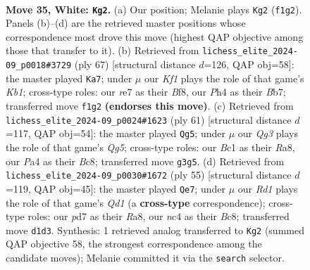 \documentclass[11pt]{article}
\begin{document}
\clearpage

\begin{figure}[p]\centering
\begin{subfigure}{0.46\textwidth}\centering
\resizebox{\linewidth}{!}{%
\newchessgame
\chessboard[
  setfen={r1b3k1/3pr1bp/1q2p3/p4p1B/P1np3P/5NQ1/1P3P2/RNBR1K2 w - - 0 35},
  showmover=false,
  pgfstyle=straightmove, color=movearrow, markmove={f1-g2}
]}
\caption{}
\end{subfigure}\hfill
\begin{subfigure}{0.46\textwidth}\centering
\resizebox{\linewidth}{!}{%
\newchessgame
\chessboard[
  setfen={1k3b2/1b6/pnr1p1Q1/qn1pP1P1/1p1P4/1P6/P1P1N2P/1KB2B1R b - - 0 34},
  showmover=false,
  pgfstyle=straightmove, color=movearrow, markmove={b8-a7}
]}
\caption{}
\end{subfigure}
\\[4pt]
\begin{subfigure}{0.46\textwidth}\centering
\resizebox{\linewidth}{!}{%
\newchessgame
\chessboard[
  setfen={r1b1r1k1/p4pp1/2P4p/3p3P/Q2Nn1q1/4P1P1/1PR2P2/4KB1R b K - 0 31},
  showmover=false,
  pgfstyle=straightmove, color=movearrow, markmove={g4-g5}
]}
\caption{}
\end{subfigure}\hfill
\begin{subfigure}{0.46\textwidth}\centering
\resizebox{\linewidth}{!}{%
\newchessgame
\chessboard[
  setfen={r1bqrnk1/5p2/pp1p4/2pP1PPQ/P1P2R2/2NB3P/1P5K/R7 b - - 0 28},
  showmover=false,
  pgfstyle=straightmove, color=movearrow, markmove={d8-e7}
]}
\caption{}
\end{subfigure}
\caption{\textbf{Move 35, White: \texttt{Kg2}.} (a) Our position; Melanie plays \texttt{Kg2} (\texttt{f1g2}). Panels (b)--(d) are the retrieved master positions whose correspondence most drove this move (highest QAP objective among those that transfer to it). (b) Retrieved from \texttt{lichess\_elite\_2024-09\_p0018\#3729} (ply 67) [structural distance $d$=126, QAP obj=58]: the master played \texttt{Ka7}; under $\mu$ our \emph{Kf1} plays the role of that game's \emph{Kb1}; cross-type roles: our \emph{r}e7 as their \emph{B}f8, our \emph{P}h4 as their \emph{B}b7; transferred move \texttt{f1g2} \textbf{(endorses this move)}. (c) Retrieved from \texttt{lichess\_elite\_2024-09\_p0024\#1623} (ply 61) [structural distance $d$=117, QAP obj=54]: the master played \texttt{Qg5}; under $\mu$ our \emph{Qg3} plays the role of that game's \emph{Qg5}; cross-type roles: our \emph{B}c1 as their \emph{R}a8, our \emph{P}a4 as their \emph{B}c8; transferred move \texttt{g3g5}. (d) Retrieved from \texttt{lichess\_elite\_2024-09\_p0030\#1672} (ply 55) [structural distance $d$=119, QAP obj=45]: the master played \texttt{Qe7}; under $\mu$ our \emph{Rd1} plays the role of that game's \emph{Qd1} (a \textbf{cross-type} correspondence); cross-type roles: our \emph{p}d7 as their \emph{R}a8, our \emph{n}c4 as their \emph{B}c8; transferred move \texttt{d1d3}. Synthesis: 1 retrieved analog transferred to \texttt{Kg2} (summed QAP objective 58, the strongest correspondence among the candidate moves); Melanie committed it via the \texttt{search} selector.}
\label{fig:thought-m68}
\end{figure}
\end{document}
